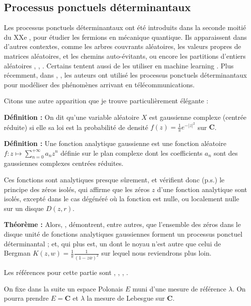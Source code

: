 \documentclass[12pt]{article}
\let\oldsum\sum
\renewcommand{\sum}{\oldsum\limits}
\begin{document}
\subsection{Processus ponctuels déterminantaux}

Les processus ponctuels déterminantaux ont été introduits dans la seconde moitié du XXe \cite{Macchi1975}, pour étudier les fermions en mécanique quantique. Ils apparaissent dans d'autres contextes, comme les arbres couvrants aléatoires, les valeurs propres de matrices aléatoires, et les chemins auto-évitants, ou encore les partitions d'entiers aléatoires \cite{Burton1993}, \cite{Tao2024}, \cite{Meliot2021}. Certains tentent aussi de les utiliser en machine learning \cite{DeterminantalML2013}. Plus récemment, dans \cite{Miyoshi2014}, \cite{TorrisiLeonardi2014}, \cite{Vergne2014} les auteurs ont utilisé les processus ponctuels déterminantaux pour modéliser des phénomènes arrivant en télécommunications.

Citons une autre apparition que je trouve particulièrement élégante :

\textbf{Définition :} On dit qu'une variable aléatoire $X$ est gaussienne complexe (centrée réduite) si elle sa loi est la probabilité de densité $f(z) = \frac 1 \pi e^{-|z|^2}$ sur $\mathbf C$.

\textbf{Définition :} Une fonction analytique gaussienne est une fonction aléatoire $ f : z \mapsto \sum_{n=0}^{+\infty} a_n z^n $ définie sur le plan complexe dont les coefficients $a_n$ sont des gaussiennes complexes centrées réduites.

Ces fonctions sont analytiques presque sûrement, et vérifient donc (p.s.) le principe des zéros isolés, qui affirme que les zéros $z$ d'une fonction analytique sont isolés, excepté dans le cas dégénéré où la fonction est nulle, ou localement nulle sur un disque $D(z,r)$.

\textbf{Théorème :} Alors, \cite{Hough2009ZerosGAF}, \cite{ZerosGaussianPowerSeries} démontrent, entre autres, que l'ensemble des zéros dans le disque unité de fonctions analytiques gaussiennes forment un processus ponctuel déterminantal ; et, qui plus est, un dont le noyau n'est autre que celui de Bergman $ \displaystyle K(z,w) = \frac 1 \pi \frac{1}{(1- z\overline w)^2} $ sur lequel nous reviendrons plus loin.

Les références pour cette partie sont \cite{Hough2006}, \cite{Macchi1975}, \cite{Soshnikov2000}, \cite{Meliot2021}.

On fixe dans la suite un espace Polonais $E$ muni d'une mesure de référence $ \lambda $. On pourra prendre $ E = \mathbf C $ et $ \lambda $ la mesure de Lebesgue sur $ \mathbf C $.
\end{document}

